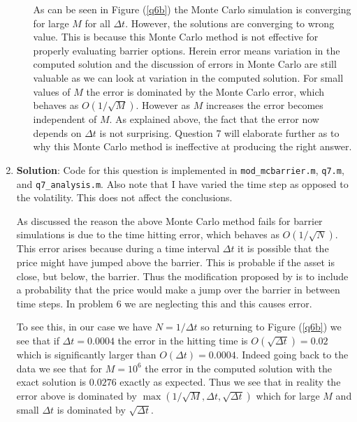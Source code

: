 \documentclass[10pt,english]{article}
\theoremstyle{plain}
\newcommand{\dt}{\Delta t}
\begin{document}
\begin{enumerate}
\begin{enumerate}
As can be seen in Figure (\ref{q6b}) the Monte Carlo simulation is converging for large $M$ for all $\dt$. However, the solutions are converging to wrong value. This is because this Monte Carlo method is not effective for properly evaluating barrier options. Herein error means variation in the computed solution and the discussion of errors in Monte Carlo are still valuable as we can look at variation in the computed solution. For small values of $M$ the error is dominated by the Monte Carlo error, which behaves as $O(1/\sqrt{M})$. However as $M$ increases the error becomes independent of $M$. As explained above, the fact that the error now depends on $\dt$ is not surprising. Question 7 will elaborate further as to why this Monte Carlo method is ineffective at producing the right answer.  
\end{enumerate}



\item \textbf{Solution}: Code for this question is implemented in \texttt{mod\_mcbarrier.m}, \texttt{q7.m}, and \texttt{q7\_analysis.m}. Also note that I have varied the time step as opposed to the volatility. This does not affect the conclusions.

As discussed \cite{Moon} the reason the above Monte Carlo method fails for barrier simulations is due to the time hitting error, which behaves as $O(1/\sqrt{N})$. This error arises because during a time interval $\dt$ it is possible that the price might have jumped above the barrier. This is probable if the asset is close, but below, the barrier. Thus the modification proposed by \cite{Moon} is to include a probability that the price would make a jump over the barrier in between time steps. In problem 6 we are neglecting this and this causes error.

To see this, in our case we have $N=1/\dt$ so returning to Figure (\ref{q6b}) we see that if $\dt=0.0004$ the error in the hitting time is $O(\sqrt{\dt})=0.02$ which is significantly larger than $O(\dt)=0.0004$. Indeed going back to the data we see that for $M=10^{6}$ the error in the computed solution with the exact solution is $0.0276$ exactly as expected. Thus we see that in reality the error above is dominated by $\max(1/\sqrt{M},\dt,\sqrt{\dt})$ which for large $M$ and small $\dt$ is dominated by $\sqrt{\dt}$. 


\end{enumerate}
\end{document}
